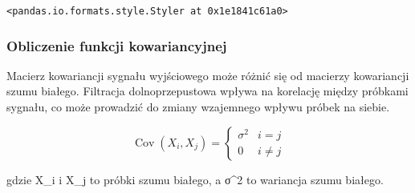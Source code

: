 \documentclass[11pt]{article}
\makeatletter
\newcommand{\boxspacing}{\kern\kvtcb@left@rule\kern\kvtcb@boxsep}
\newcommand{\prompt}[4]{
        {\ttfamily\llap{{\color{#2}[#3]:\hspace{3pt}#4}}\vspace{-\baselineskip}}
    }
\makeatother
\begin{document}
            \begin{tcolorbox}[breakable, size=fbox, boxrule=.5pt, pad at break*=1mm, opacityfill=0]
\prompt{Out}{outcolor}{93}{\boxspacing}
\begin{Verbatim}[commandchars=\\\{\}]
<pandas.io.formats.style.Styler at 0x1e1841c61a0>
\end{Verbatim}
\end{tcolorbox}


        
    \hypertarget{obliczenie-funkcji-kowariancyjnej}{%
\subsubsection{Obliczenie funkcji
kowariancyjnej}\label{obliczenie-funkcji-kowariancyjnej}}

Macierz kowariancji sygnału wyjściowego może różnić się od macierzy
kowariancji szumu białego. Filtracja dolnoprzepustowa wpływa na
korelację między próbkami sygnału, co może prowadzić do zmiany
wzajemnego wpływu próbek na siebie.

\[ \operatorname{Cov}(X_i, X_j) = \begin{cases} \sigma^2 & i = j \\ 0 & i \neq j \end{cases} \]

gdzie X\_i i X\_j to próbki szumu białego, a σ\^{}2 to wariancja szumu
białego.
\end{document}
